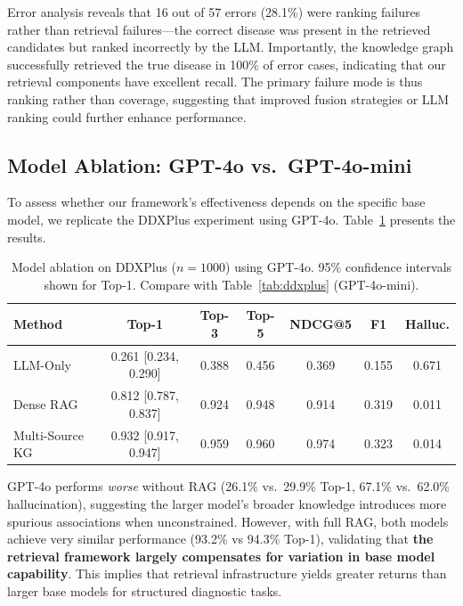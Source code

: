 \documentclass[preprint,12pt]{elsarticle}
\begin{document}
Error analysis reveals that 16 out of 57 errors (28.1\%) were ranking failures rather than retrieval failures---the correct disease was present in the retrieved candidates but ranked incorrectly by the LLM. Importantly, the knowledge graph successfully retrieved the true disease in 100\% of error cases, indicating that our retrieval components have excellent recall. The primary failure mode is thus ranking rather than coverage, suggesting that improved fusion strategies or LLM ranking could further enhance performance.

\subsection{Model Ablation: GPT-4o vs.\ GPT-4o-mini}
\label{sec:model_ablation}

To assess whether our framework's effectiveness depends on the specific base model, we replicate the DDXPlus experiment using GPT-4o. Table~\ref{tab:gpt4o} presents the results.

\begin{table}[t]
\centering
\caption{Model ablation on DDXPlus ($n{=}1000$) using GPT-4o. 95\% confidence intervals shown for Top-1. Compare with Table~\ref{tab:ddxplus} (GPT-4o-mini).}
\label{tab:gpt4o}
\begin{tabular}{lcccccc}
\toprule
\textbf{Method} & \textbf{Top-1} & \textbf{Top-3} & \textbf{Top-5} & \textbf{NDCG@5} & \textbf{F1} & \textbf{Halluc.} \\
\midrule
LLM-Only       & 0.261 [0.234, 0.290] & 0.388 & 0.456 & 0.369 & 0.155 & 0.671 \\
Dense RAG       & 0.812 [0.787, 0.837] & 0.924 & 0.948 & 0.914 & 0.319 & 0.011 \\
Multi-Source KG & 0.932 [0.917, 0.947] & 0.959 & 0.960 & 0.974 & 0.323 & 0.014 \\
\bottomrule
\end{tabular}
\end{table}

GPT-4o performs \emph{worse} without RAG (26.1\% vs.\ 29.9\% Top-1, 67.1\% vs.\ 62.0\% hallucination), suggesting the larger model's broader knowledge introduces more spurious associations when unconstrained. However, with full RAG, both models achieve very similar performance (93.2\% vs 94.3\% Top-1), validating that \textbf{the retrieval framework largely compensates for variation in base model capability}. This implies that retrieval infrastructure yields greater returns than larger base models for structured diagnostic tasks.
\end{document}
